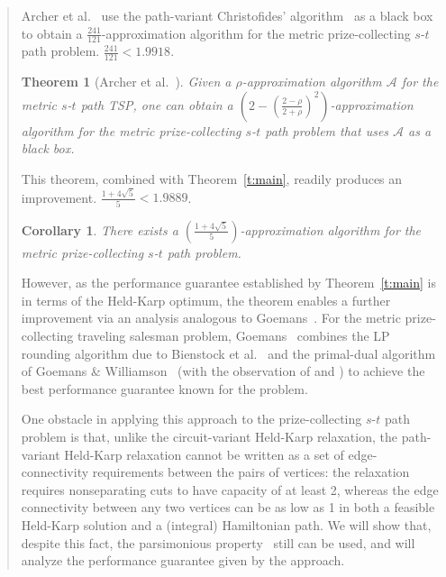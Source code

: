 \documentclass[11pt,letterpaper]{article}
\newtheorem{thm}{Theorem}
\newtheorem{cor}{Corollary}
\newcommand{\st}{\mbox{$s$-$t$} }
\begin{document}
\begin{quote}
Archer et al.~\cite{ABHK} use the path-variant Christofides' algorithm~\cite{H} as a black box to obtain a $\frac{241}{121}$-approximation algorithm for the metric prize-collecting \st path problem. $\frac{241}{121}<1.9918$.

\begin{thm}[Archer et al.~\cite{ABHK}]\label{t:abhk}
Given a $\rho$-approximation algorithm $\mathscr{A}$ for the  metric \st path TSP, one can obtain a $\left(2-\left(\frac{2-\rho}{2+\rho}\right)^2\right)$-approximation algorithm for the metric prize-collecting \st path problem that uses $\mathscr{A}$ as a black box.
\end{thm}

This theorem, combined with Theorem~\ref{t:main}, readily produces an improvement. $\frac{1+4\sqrt{5}}{5}<1.9889$.

\begin{cor}
There exists a $\left(\frac{1+4\sqrt{5}}{5}\right)$-approximation algorithm for the metric prize-collecting \st path problem.
\end{cor}

However, as the performance guarantee established by Theorem~\ref{t:main} is in terms of the Held-Karp optimum, the theorem enables a further improvement via an analysis analogous to Goemans~\cite{G:pc}. For the metric prize-collecting traveling salesman problem, Goemans~\cite{G:pc} combines the LP rounding algorithm due to Bienstock et al.~\cite{BGSW} and the primal-dual algorithm of Goemans \& Williamson~\cite{GW} (with the observation of \cite{CRW} and \cite{ABHK}) to achieve the best performance guarantee known for the problem.

One obstacle in applying this approach to the prize-collecting \st path problem is that, unlike the circuit-variant Held-Karp relaxation, the path-variant Held-Karp relaxation cannot be written as a set of edge-connectivity requirements between the pairs of vertices: the relaxation requires nonseparating cuts to have capacity of at least 2, whereas the edge connectivity between any two vertices can be as low as 1 in both a feasible Held-Karp solution and a (integral) Hamiltonian path. We will show that, despite this fact, the parsimonious property~\cite{GB} still can be used, and will analyze the performance guarantee given by the approach.


\end{quote}
\end{document}
